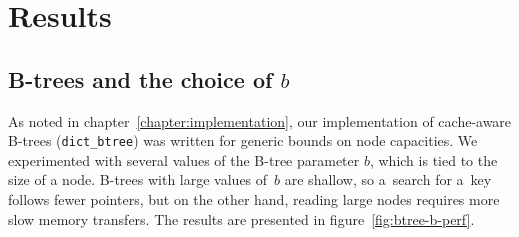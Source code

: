 \chapter{Results}
\label{chapter:results}

\section{\mbox{B-trees} and the choice of $b$}
\label{sec:btree-b-choice}
As noted in chapter~\ref{chapter:implementation}, our implementation of
cache-aware B-trees (\texttt{dict\_btree}) was written for generic bounds
on node capacities. We experimented with several values of the B-tree parameter
$b$, which is tied to the size of a node. \mbox{B-trees} with large values
of~$b$ are shallow, so a~search for a~key follows fewer pointers, but on the
other hand, reading large nodes requires more slow memory transfers.
The results are presented in figure~\ref{fig:btree-b-perf}.

